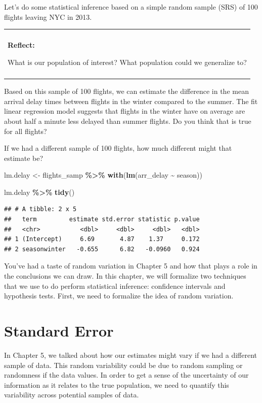 \documentclass[
]{book}
\newenvironment{Shaded}{\begin{snugshade}}{\end{snugshade}}
\newcommand{\FunctionTok}[1]{\textcolor[rgb]{0.13,0.29,0.53}{\textbf{#1}}}
\newcommand{\NormalTok}[1]{#1}
\newcommand{\OtherTok}[1]{\textcolor[rgb]{0.56,0.35,0.01}{#1}}
\newcommand{\SpecialCharTok}[1]{\textcolor[rgb]{0.81,0.36,0.00}{\textbf{#1}}}
\newenvironment{reflect}
{
    \begin{center}
    
    \begin{tabular}{|p{0.8\textwidth}|}
    \rowcolor{LightBlue}
    \hline\\
    \rowcolor{LightBlue}
    \textbf{Reflect:}
}
{
    \\\rowcolor{LightBlue}
    \\\hline
    \end{tabular} 
    \end{center}
}
\begin{document}
Let's do some statistical inference based on a simple random sample (SRS) of 100 flights leaving NYC in 2013.

\begin{reflect}
What is our population of interest? What population could we generalize
to?
\end{reflect}

Based on this sample of 100 flights, we can estimate the difference in the mean arrival delay times between flights in the winter compared to the summer. The fit linear regression model suggests that flights in the winter have on average are about half a minute less delayed than summer flights. Do you think that is true for all flights?

If we had a different sample of 100 flights, how much different might that estimate be?

\begin{Shaded}
\begin{Highlighting}[]
\NormalTok{lm.delay }\OtherTok{\textless{}{-}}\NormalTok{ flights\_samp }\SpecialCharTok{\%\textgreater{}\%}
  \FunctionTok{with}\NormalTok{(}\FunctionTok{lm}\NormalTok{(arr\_delay }\SpecialCharTok{\textasciitilde{}}\NormalTok{ season))}

\NormalTok{lm.delay }\SpecialCharTok{\%\textgreater{}\%} 
  \FunctionTok{tidy}\NormalTok{()}
\end{Highlighting}
\end{Shaded}

\begin{verbatim}
## # A tibble: 2 x 5
##   term         estimate std.error statistic p.value
##   <chr>           <dbl>     <dbl>     <dbl>   <dbl>
## 1 (Intercept)     6.69       4.87    1.37     0.172
## 2 seasonwinter   -0.655      6.82   -0.0960   0.924
\end{verbatim}

You've had a taste of random variation in Chapter 5 and how that plays a role in the conclusions we can draw. In this chapter, we will formalize two techniques that we use to do perform statistical inference: confidence intervals and hypothesis tests. First, we need to formalize the idea of random variation.

\section{Standard Error}\label{standard-error}

In Chapter 5, we talked about how our estimates might vary if we had a different sample of data. This random variability could be due to random sampling or randomness if the data values. In order to get a sense of the uncertainty of our information as it relates to the true population, we need to quantify this variability across potential samples of data.
\end{document}
